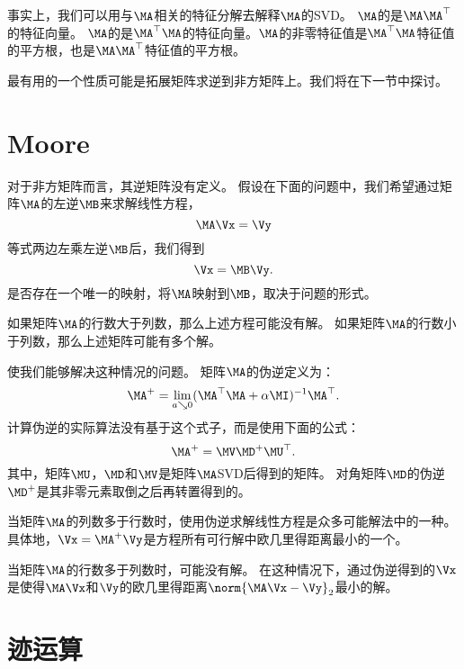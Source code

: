 事实上，我们可以用与$\MA$相关的特征分解去解释$\MA$的\gls{SVD}。
$\MA$的是$\MA\MA^\top$的特征向量。
$\MA$的是$\MA^\top\MA$的特征向量。$
\MA$的非零特征值是$\MA^\top\MA$特征值的平方根，也是$\MA\MA^\top$特征值的平方根。


最有用的一个性质可能是拓展矩阵求逆到非方矩阵上。我们将在下一节中探讨。




\section{\gls{Moore}}
\label{sec:the_moore_penrose_pseudoinverse_matrix}


对于非方矩阵而言，其逆矩阵没有定义。
假设在下面的问题中，我们希望通过矩阵$\MA$的左逆$\MB$来求解线性方程，
\begin{equation}
    \MA\Vx=\Vy
\end{equation}
等式两边左乘左逆$\MB$后，我们得到
\begin{equation}
    \Vx=\MB\Vy.
\end{equation}
是否存在一个唯一的映射，将$\MA$映射到$\MB$，取决于问题的形式。


如果矩阵$\MA$的行数大于列数，那么上述方程可能没有解。
如果矩阵$\MA$的行数小于列数，那么上述矩阵可能有多个解。


使我们能够解决这种情况的问题。
矩阵$\MA$的伪逆定义为：
\begin{equation}
    \MA^+ = \lim_{a \searrow 0} (\MA^\top\MA + \alpha \MI)^{-1} \MA^\top.
\end{equation}
计算伪逆的实际算法没有基于这个式子，而是使用下面的公式：
\begin{equation}
    \MA^+ = \MV\MD^+\MU^\top.
\end{equation}
其中，矩阵$\MU$，$\MD$和$\MV$是矩阵$\MA$\gls{SVD}后得到的矩阵。
对角矩阵$\MD$的伪逆$\MD^+$是其非零元素取倒之后再转置得到的。


当矩阵$\MA$的列数多于行数时，使用伪逆求解线性方程是众多可能解法中的一种。
具体地，$\Vx=\MA^+\Vy$是方程所有可行解中欧几里得距离最小的一个。


当矩阵$\MA$的行数多于列数时，可能没有解。
在这种情况下，通过伪逆得到的$\Vx$是使得$\MA\Vx$和$\Vy$的欧几里得距离$\norm{\MA\Vx-\Vy}_2$最小的解。




\section{迹运算}
\label{sec:the_trace_operator}

